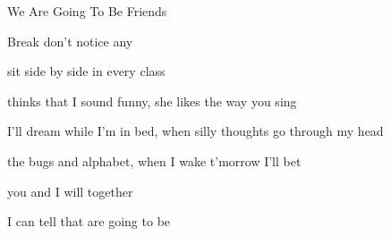 \begin{SBSong}{We Are Going To Be Friends}
\begin{SBBracket}{Break}
     don't notice any
    
     sit side by side in every class
    
     thinks that I sound funny, \WBLineBrk {} she likes the way you sing
  \end{SBBracket}
  \begin{SBVerse}
     I'll dream while I'm in bed, when silly thoughts \WBLineBrk go through my head
    
     the bugs and alphabet,  when I wake t'morrow I'll bet
    
     you and I will  together 
    
     I can tell that  are going to be 
  \end{SBVerse}
\end{SBSong}
